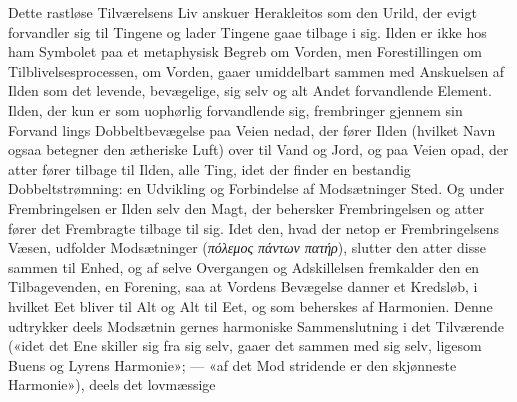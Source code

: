 \documentclass[12pt,a4paper]{book}
\newcommand{\gk}[1]{\textit{#1}}
\begin{document}
Dette rastløse Tilværelsens Liv anskuer Herakleitos som
den Urild, der evigt forvandler sig til Tingene og lader
Tingene gaae tilbage i sig. Ilden er ikke hos ham Symbolet
paa et metaphysisk Begreb om Vorden, men Forestillingen om
Tilblivelsesprocessen, om Vorden, gaaer umiddelbart sammen
med Anskuelsen af Ilden som det levende, bevægelige, sig selv
og alt Andet forvandlende Element. Ilden, der kun er som
uophørlig forvandlende sig, frembringer gjennem sin Forvand\-%
lings Dobbeltbevægelse paa Veien nedad, der fører Ilden (hvilket
Navn ogsaa betegner den ætheriske Luft) over til Vand og Jord,
og paa Veien opad, der atter fører tilbage til Ilden, alle Ting,
idet der finder en bestandig Dobbeltstrømning: en Udvikling
og Forbindelse af Modsætninger Sted. Og under Frembringelsen
er Ilden selv den Magt, der behersker Frembringelsen og atter
fører det Frembragte tilbage til sig. Idet den, hvad der
netop er Frembringelsens Væsen, udfolder Modsætninger
(\gk{πόλεμος πάντων πατήρ}), slutter den atter disse sammen til
Enhed, og af selve Overgangen og Adskillelsen fremkalder den en
Tilbagevenden, en Forening, saa at Vordens Bevægelse danner
et Kredsløb, i hvilket Eet bliver til Alt og Alt til Eet, og som
beherskes af Harmonien. Denne udtrykker deels Modsætnin\-%
gernes harmoniske Sammenslutning i det Tilværende («idet det
Ene skiller sig fra sig selv, gaaer det sammen med sig
selv, ligesom Buens og Lyrens Harmonie»; --- «af det Mod\-%
stridende er den skjønneste Harmonie»), deels det lovmæssige
%
\end{document}
